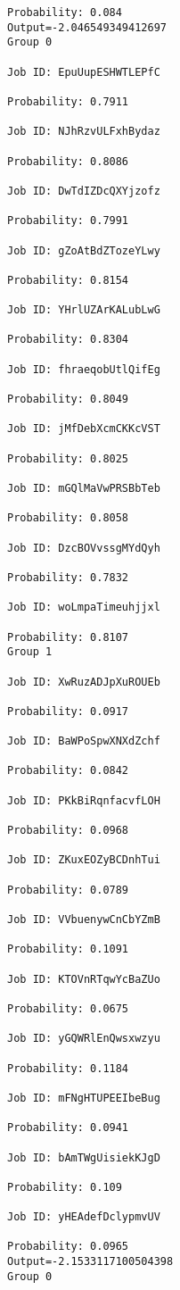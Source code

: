 \documentclass[11pt]{article}
\begin{document}
\begin{Verbatim}[commandchars=\\\{\}]
Probability: 0.084
Output=-2.046549349412697
Group 0

Job ID: EpuUupESHWTLEPfC

Probability: 0.7911

Job ID: NJhRzvULFxhBydaz

Probability: 0.8086

Job ID: DwTdIZDcQXYjzofz

Probability: 0.7991

Job ID: gZoAtBdZTozeYLwy

Probability: 0.8154

Job ID: YHrlUZArKALubLwG

Probability: 0.8304

Job ID: fhraeqobUtlQifEg

Probability: 0.8049

Job ID: jMfDebXcmCKKcVST

Probability: 0.8025

Job ID: mGQlMaVwPRSBbTeb

Probability: 0.8058

Job ID: DzcBOVvssgMYdQyh

Probability: 0.7832

Job ID: woLmpaTimeuhjjxl

Probability: 0.8107
Group 1

Job ID: XwRuzADJpXuROUEb

Probability: 0.0917

Job ID: BaWPoSpwXNXdZchf

Probability: 0.0842

Job ID: PKkBiRqnfacvfLOH

Probability: 0.0968

Job ID: ZKuxEOZyBCDnhTui

Probability: 0.0789

Job ID: VVbuenywCnCbYZmB

Probability: 0.1091

Job ID: KTOVnRTqwYcBaZUo

Probability: 0.0675

Job ID: yGQWRlEnQwsxwzyu

Probability: 0.1184

Job ID: mFNgHTUPEEIbeBug

Probability: 0.0941

Job ID: bAmTWgUisiekKJgD

Probability: 0.109

Job ID: yHEAdefDclypmvUV

Probability: 0.0965
Output=-2.1533117100504398
Group 0


\end{Verbatim}
\end{document}
